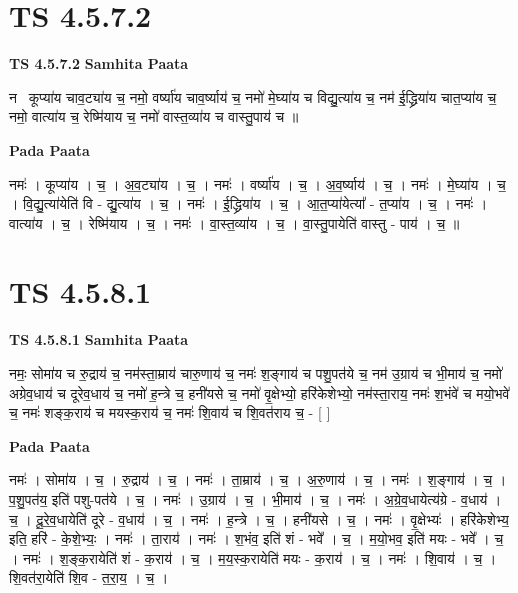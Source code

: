 \documentclass[17pt]{extarticle}
\begin{document}

\section{ TS 4.5.7.2 }

\textbf{TS 4.5.7.2 } \newline
\textbf{Samhita Paata} \newline

नमः᳡कूप्या॑य चाव॒ट्या॑य च॒ नमो॒ वर्ष्या॑य चाव॒र्ष्याय॑ च॒ नमो॑ मे॒घ्या॑य च विद्यु॒त्या॑य च॒ नम॑ ई॒द्ध्रिया॑य चात॒प्या॑य च॒ नमो॒ वात्या॑य च॒ रेष्मि॑याय च॒ नमो॑ वास्त॒व्या॑य च वास्तु॒पाय॑ च ॥ \newline

\textbf{Pada Paata} \newline

नमः॑ । कूप्या॑य । च॒ । अ॒व॒ट्या॑य । च॒ । नमः॑ । वर्ष्या॑य । च॒ । अ॒व॒र्ष्याय॑ । च॒ । नमः॑ । मे॒घ्या॑य । च॒ । वि॒द्यु॒त्या॑येति॑ वि - द्यु॒त्या॑य । च॒ । नमः॑ । ई॒द्ध्रिया॑य । च॒ । आ॒त॒प्या॑येत्या᳚ - त॒प्या॑य । च॒ । नमः॑ । वात्या॑य । च॒ । रेष्मि॑याय । च॒ । नमः॑ । वा॒स्त॒व्या॑य । च॒ । वा॒स्तु॒पायेति॑ वास्तु - पाय॑ । च॒ ॥  \newline





\section{ TS 4.5.8.1 }

\textbf{TS 4.5.8.1 } \newline
\textbf{Samhita Paata} \newline

नमः॒ सोमा॑य च रु॒द्राय॑ च॒ नम॑स्ता॒म्राय॑ चारु॒णाय॑ च॒ नमः॑ श॒ङ्गाय॑ च पशु॒पत॑ये च॒ नम॑ उ॒ग्राय॑ च भी॒माय॑ च॒ नमो॑ अग्रेव॒धाय॑ च दूरेव॒धाय॑ च॒ नमो॑ ह॒न्त्रे च॒ हनी॑यसे च॒ नमो॑ वृ॒क्षेभ्यो॒ हरि॑केशेभ्यो॒ नम॑स्ता॒राय॒ नमः॑ श॒भंवे॑ च मयो॒भवे॑ च॒ नमः॑ शङ्क॒राय॑ च मयस्क॒राय॑ च॒ नमः॑ शि॒वाय॑ च शि॒वत॑राय च॒ - [  ] \newline

\textbf{Pada Paata} \newline

नमः॑ । सोमा॑य । च॒ । रु॒द्राय॑ । च॒ । नमः॑ । ता॒म्राय॑ । च॒ । अ॒रु॒णाय॑ । च॒ । नमः॑ । श॒ङ्गाय॑ । च॒ । प॒शु॒पत॑य॒ इति॑ पशु-पत॑ये । च॒ । नमः॑ । उ॒ग्राय॑ । च॒ । भी॒माय॑ । च॒ । नमः॑ । अ॒ग्रे॒व॒धायेत्य॑ग्रे - व॒धाय॑ । च॒ । दू॒रे॒व॒धायेति॑ दूरे - व॒धाय॑ । च॒ । नमः॑ । ह॒न्त्रे । च॒ । हनी॑यसे । च॒ । नमः॑ । वृ॒क्षेभ्यः॑ । हरि॑केशेभ्य॒ इति॒ हरि॑ - के॒शे॒भ्यः॒ । नमः॑ । ता॒राय॑ । नमः॑ । श॒भंव॒ इति॑ शं - भवे᳚ । च॒ । म॒यो॒भव॒ इति॑ मयः - भवे᳚ । च॒ । नमः॑ । श॒ङ्क॒रायेति॑ शं - क॒राय॑ । च॒ । म॒य॒स्क॒रायेति॑ मयः - क॒राय॑ । च॒ । नमः॑ । शि॒वाय॑ । च॒ । शि॒वत॑रा॒येति॑ शि॒व - त॒रा॒य॒ । च॒ ।  \newline
\end{document}
